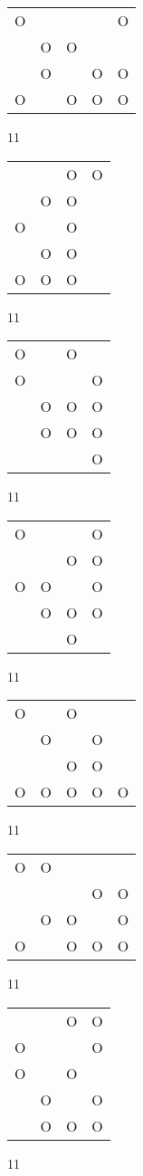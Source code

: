 \begin{tabular}{|m{0.2cm}m{0.2cm}m{0.2cm}m{0.2cm}m{0.2cm}|}\hline
O& & & &O\\
 &O&O& & \\
 &O& &O&O\\
O& &O&O&O\\
\hline\end{tabular}11
\begin{tabular}{|m{0.2cm}m{0.2cm}m{0.2cm}m{0.2cm}|}\hline
 & &O&O\\
 &O&O& \\
O& &O& \\
 &O&O& \\
O&O&O& \\
\hline\end{tabular}11
\begin{tabular}{|m{0.2cm}m{0.2cm}m{0.2cm}m{0.2cm}|}\hline
O& &O& \\
O& & &O\\
 &O&O&O\\
 &O&O&O\\
 & & &O\\
\hline\end{tabular}11
\begin{tabular}{|m{0.2cm}m{0.2cm}m{0.2cm}m{0.2cm}|}\hline
O& & &O\\
 & &O&O\\
O&O& &O\\
 &O&O&O\\
 & &O& \\
\hline\end{tabular}11
\begin{tabular}{|m{0.2cm}m{0.2cm}m{0.2cm}m{0.2cm}m{0.2cm}|}\hline
O& &O& & \\
 &O& &O& \\
 & &O&O& \\
O&O&O&O&O\\
\hline\end{tabular}11
\begin{tabular}{|m{0.2cm}m{0.2cm}m{0.2cm}m{0.2cm}m{0.2cm}|}\hline
O&O& & & \\
 & & &O&O\\
 &O&O& &O\\
O& &O&O&O\\
\hline\end{tabular}11
\begin{tabular}{|m{0.2cm}m{0.2cm}m{0.2cm}m{0.2cm}|}\hline
 & &O&O\\
O& & &O\\
O& &O& \\
 &O& &O\\
 &O&O&O\\
\hline\end{tabular}11
